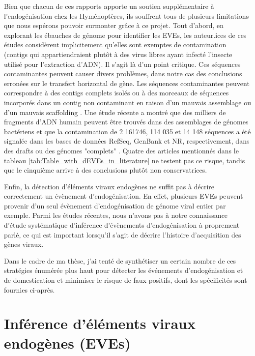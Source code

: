 Bien que chacun de ces rapports apporte un soutien supplémentaire à l'endogénisation chez les Hyménoptères, ils souffrent tous de plusieurs limitations que nous espérons pouvoir surmonter grâce à ce projet. Tout d'abord, en explorant les ébauches de génome pour identifier les EVEs, les auteur.ices de ces études considèrent implicitement qu'elles sont exemptes de contamination (contigs qui appartiendraient plutôt à des virus libres ayant infecté l'insecte utilisé pour l'extraction d'ADN). Il s'agit là d'un point critique. Ces séquences contaminantes peuvent causer divers problèmes, dans notre cas des conclusions erronées sur le transfert horizontal de gène. Les séquences contaminantes peuvent correspondre à des contigs complets isolés ou à des morceaux de séquences incorporés dans un contig non contaminant en raison d'un mauvais assemblage ou d'un mauvais scaffolding \citep{wu_mec_2020}. Une étude récente a montré que des milliers de fragments d'ADN humain peuvent être trouvés dans des assemblages de génomes bactériens \citep{breitwieser_human_2019} et que la contamination de 2 161746, 114 035 et 14 148 séquences a été signalée dans les bases de données RefSeq, GenBank et NR, respectivement, dans des drafts ou des génomes "complets" \citep{steinegger_terminating_2020}. Quatre des articles mentionnés dans le tableau \ref{tab:Table_with_dEVEs_in_literature} ne testent pas ce risque, tandis que le cinquième \citep{burke_presence_2021} arrive à des conclusions plutôt non conservatrices.

Enfin, la détection d'éléments viraux endogènes ne suffit pas à décrire correctement un évènement d'endogénisation. En effet, plusieurs EVEs peuvent provenir d'un seul évènement d'endogénisation de génome viral entier par exemple. Parmi les études récentes, nous n'avons pas à notre connaissance d'étude systématique d'inférence d'évènements d'endogénisation à proprement parlé, ce qui est important lorsqu'il s'agit de décrire l'histoire d'acquisition des gènes viraux. 

Dans le cadre de ma thèse, j'ai tenté de synthétiser un certain nombre de ces stratégies énumérée plus haut pour détecter les événements d'endogénisation et de domestication et minimiser le risque de faux positifs, dont les spécificités sont fournies ci-après. 

\section{Inférence d'éléments viraux endogènes (EVEs)}

